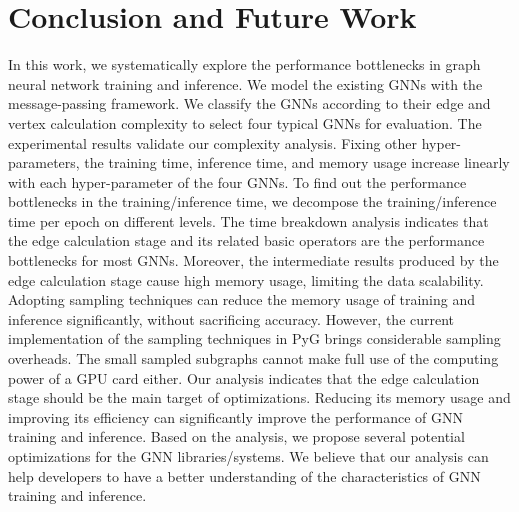 \section{Conclusion and Future Work}
\label{sec:conclusion}

In this work, we systematically explore the performance bottlenecks in graph neural network training and inference.
%
We model the existing GNNs with the message-passing framework. 
%
We classify the GNNs according to their edge and vertex calculation complexity to select four typical GNNs for evaluation. 
%
The experimental results validate our complexity analysis.
%
Fixing other hyper-parameters, the training time, inference time, and memory usage increase linearly with each hyper-parameter of the four GNNs.
%
To find out the performance bottlenecks in the training/inference time, we decompose the training/inference time per epoch on different levels.
%
The time breakdown analysis indicates that the edge calculation stage and its related basic operators are the performance bottlenecks for most GNNs.
%
Moreover, the intermediate results produced by the edge calculation stage cause high memory usage, limiting the data scalability.
%
Adopting sampling techniques can reduce the memory usage of training and inference significantly, without sacrificing accuracy. 
%
However, the current implementation of the sampling techniques in PyG brings considerable sampling overheads.
%
The small sampled subgraphs cannot make full use of the computing power of a GPU card either.
% 
Our analysis indicates that the edge calculation stage should be the main target of optimizations.
%
Reducing its memory usage and improving its efficiency can significantly improve the performance of GNN training and inference.
%
Based on the analysis, we propose several potential optimizations for the GNN libraries/systems.
%
We believe that our analysis can help developers to have a better understanding of the characteristics of GNN training and inference.

